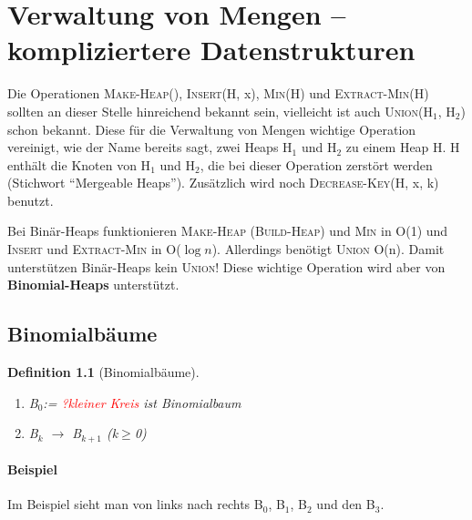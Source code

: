 \documentclass[ngerman,draft,parskip=half*,twoside]{scrreprt}
\theoremstyle{break}
\newtheorem{definition}{Definition}
\begin{document}
\chapter{Verwaltung von Mengen -- kompliziertere Datenstrukturen}
Die Operationen \textsc{Make-Heap}(), \textsc{Insert}(H, x), \textsc{Min}(H) und \textsc{Extract-Min}(H) sollten an dieser Stelle
hinreichend bekannt sein, vielleicht ist auch \textsc{Union}(H$_1$, H$_2$) schon bekannt. Diese für die Verwaltung von Mengen wichtige
Operation vereinigt, wie der Name bereits sagt, zwei Heaps H$_1$ und H$_2$ zu einem Heap H. H enthält die Knoten von H$_1$ und H$_2$,
die bei dieser Operation zerstört werden (Stichwort "`Mergeable Heaps"'). Zusätzlich wird noch \textsc{Decrease-Key}(H, x, k) benutzt.

Bei Binär-Heaps funktionieren \textsc{Make-Heap} (\textsc{Build-Heap}) und \textsc{Min} in O(1) und \textsc{Insert} und
\textsc{Extract-Min} in O($\log n$). Allerdings benötigt \textsc{Union} O(n). Damit unterstützen Binär-Heaps kein \textsc{Union}!
Diese wichtige Operation wird aber von \textbf{Binomial-Heaps} unterstützt.

\section{Binomialbäume}
\begin{definition}[Binomialbäume]
\begin{enumerate}
\item B$_0$:= \textcolor{red}{?kleiner Kreis} ist Binomialbaum
\item B$_k$ $\rightarrow$ B$_{k+1}$ (k$\geq$0)
  \begin{figure}[H]
  \centering
   
  
  \end{figure}
\end{enumerate}
\end{definition}
\subsubsection{Beispiel}
\begin{figure}[H]
  \centering
   
  
  \end{figure}
  Im Beispiel sieht man von links nach rechts B$_0$, B$_1$, B$_2$ und den B$_3$.
\end{document}
